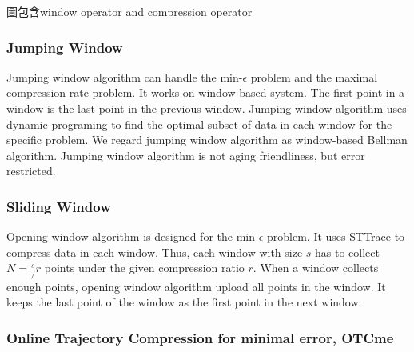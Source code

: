 \documentclass[12pt]{article}
\begin{document}
\begin{CJK}{UTF8}{bsmi}
圖包含window operator and compression operator


\subsubsection{Jumping Window}

Jumping window algorithm can handle the min-$\epsilon$ problem and the maximal compression rate problem. It works on window-based system. The first point in a window is the last point in the previous window. Jumping window algorithm uses dynamic programing to find the optimal subset of data in each window for the specific problem. We regard jumping window algorithm as window-based Bellman algorithm.  Jumping window algorithm is not aging friendliness, but error restricted.



\subsubsection{Sliding Window}


Opening window algorithm is designed for the min-$\epsilon$ problem. It uses STTrace to compress data in each window. Thus, each window with size $s$ has to collect $ N = \frac{s}/{r} $ points under the given compression ratio $r$. When a window collects enough points, opening window algorithm upload all points in the window. It keeps the last point of the window as the first point in the next window. 

\subsubsection{Online Trajectory Compression for minimal error, OTCme}



\end{CJK}
\end{document}
